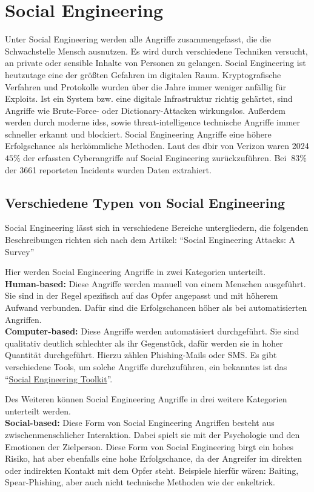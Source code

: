 \section{Social Engineering}\label{sec:social_engineering}
Unter Social Engineering werden alle Angriffe zusammengefasst, die die Schwachstelle Mensch ausnutzen.
Es wird durch verschiedene Techniken versucht, an private oder sensible Inhalte von Personen zu gelangen.
Social Engineering ist heutzutage eine der größten Gefahren im digitalen Raum.
Kryptografische Verfahren und Protokolle wurden über die Jahre immer weniger anfällig für Exploits.
Ist ein System bzw. eine digitale Infrastruktur richtig gehärtet, sind Angriffe wie Brute-Force- oder Dictionary-Attacken wirkungslos.
Außerdem werden durch moderne \glspl{ids}, sowie \gls{threat-intelligence} technische Angriffe immer schneller erkannt und blockiert.
Social Engineering Angriffe eine höhere Erfolgschance als herkömmliche Methoden.
Laut des \gls{dbir} von Verizon waren 2024 $45\%$ der erfassten Cyberangriffe auf Social Engineering zurückzuführen.
Bei $~83\%$ der 3661 reporteten Incidents wurden Daten extrahiert.\cite{verizon-2024-dbir}

\subsection{Verschiedene Typen von Social Engineering}\label{subsec:verschiedene-typen-von-social-engineering}
Social Engineering lässt sich in verschiedene Bereiche untergliedern, die folgenden Beschreibungen richten sich nach dem Artikel: ``Social Engineering Attacks: A Survey''\cite{social-engineering-a-survey}

Hier werden Social Engineering Angriffe in zwei Kategorien unterteilt.\\
\textbf{Human-based:} Diese Angriffe werden manuell von einem Menschen ausgeführt.
Sie sind in der Regel spezifisch auf das Opfer angepasst und mit höherem Aufwand verbunden.
Dafür sind die Erfolgschancen höher als bei automatisierten Angriffen.\\
\textbf{Computer-based:} Diese Angriffe werden automatisiert durchgeführt.
Sie sind qualitativ deutlich schlechter als ihr Gegenstück, dafür werden sie in hoher Quantität durchgeführt.
Hierzu zählen Phishing-Mails oder SMS.
Es gibt verschiedene Tools, um solche Angriffe durchzuführen, ein bekanntes ist das ``\href{https://github.com/trustedsec/social-engineer-toolkit}{Social Engineering Toolkit}''.

Des Weiteren können Social Engineering Angriffe in drei weitere Kategorien unterteilt werden.\\
\textbf{Social-based:} Diese Form von Social Engineering Angriffen besteht aus zwischenmenschlicher Interaktion.
Dabei spielt sie mit der Psychologie und den Emotionen der Zielperson.
Diese Form von Social Engineering birgt ein hohes Risiko, hat aber ebenfalls eine hohe Erfolgschance, da der Angreifer im direkten oder indirekten Kontakt mit dem Opfer steht.
Beispiele hierfür wären: Baiting, Spear-Phishing, aber auch nicht technische Methoden wie der \gls{enkeltrick}.

